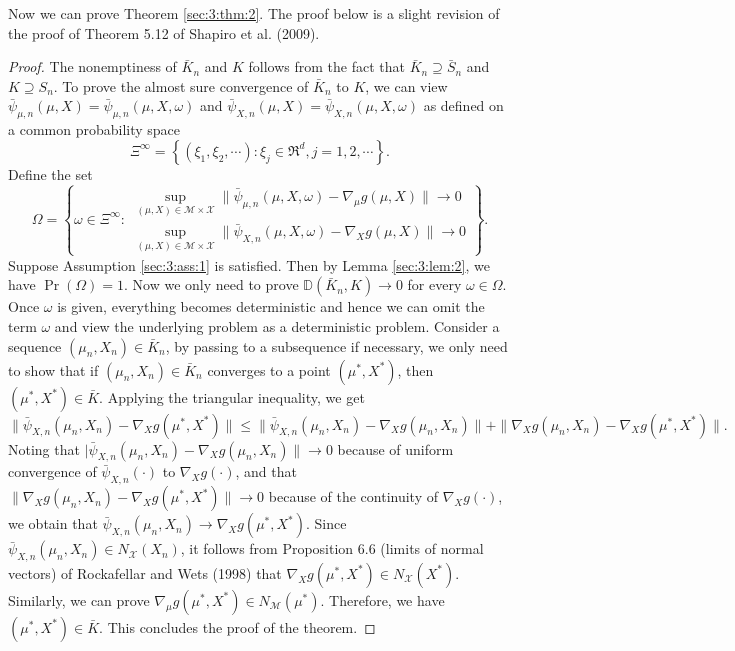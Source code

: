 Now we can prove Theorem \ref{sec:3:thm:2}. The proof below is a
slight revision of the proof of Theorem 5.12 of Shapiro et al.
(2009).

\begin{proof}
The nonemptiness of $\bar K_n$ and $K$ follows from the fact that
$\bar K_n\supseteq \bar S_n$ and $K\supseteq S_n$. To prove the
almost sure convergence of $\bar K_n$ to $K$, we can view
$\bar\psi_{\mu,n}(\mu,X)=\bar\psi_{\mu,n}(\mu,X,\omega)$ and
$\bar\psi_{X,n}(\mu,X)=\bar\psi_{X,n}(\mu,X,\omega)$ as defined on a
common probability space
\begin{equation*}
\Xi^{\infty}=\left\{(\xi_1,\xi_2,\cdots):\xi_j\in \Re^d,
j=1,2,\cdots\right\}.
\end{equation*}
Define the set
\begin{equation*}
\Omega=\left\{\omega\in \Xi^{\infty}:\begin{array}{ll}
\sup_{(\mu,X)\in\mathcal{M}\times\mathcal {X}}\|\bar
\psi_{\mu,n}(\mu,X,\omega)-\nabla_\mu g(\mu,X)\|\to 0\\
\sup_{(\mu,X)\in\mathcal{M}\times\mathcal {X}}\|\bar
\psi_{X,n}(\mu,X,\omega)-\nabla_X g(\mu,X)\|\to 0
\end{array}
\right\}.
\end{equation*}
Suppose Assumption \ref{sec:3:ass:1} is satisfied. Then by Lemma
\ref{sec:3:lem:2}, we have $\Pr(\Omega)=1$. Now we only need to
prove $\mathbb{D}(\bar K_n,K)\to 0$ for every $\omega\in \Omega$.
Once $\omega$ is given, everything becomes deterministic and hence
we can omit the term $\omega$ and view the underlying problem as a
deterministic problem. Consider a sequence $(\mu_n,X_n)\in \bar
K_n$, by passing to a subsequence if necessary, we only need to show
that if $(\mu_n,X_n)\in \bar K_n$ converges to a point
$(\mu^*,X^*)$, then $(\mu^*,X^*)\in \bar K$. Applying the triangular
inequality, we get
\begin{equation*}
\|\bar \psi_{X,n}(\mu_n,X_n)-\nabla_X g(\mu^*,X^*)\|\le\|\bar
\psi_{X,n}(\mu_n,X_n)-\nabla_X g(\mu_n,X_n)\|+ \|\nabla_X
g(\mu_n,X_n)-\nabla_X g(\mu^*,X^*)\|.
\end{equation*}
Noting that $|\bar \psi_{X,n}(\mu_n,X_n)-\nabla_X g(\mu_n,X_n)\|\to
0$ because of uniform convergence of $\bar \psi_{X,n}(\cdot)$ to
$\nabla_X g(\cdot)$, and that $\|\nabla_X g(\mu_n,X_n)-\nabla_X
g(\mu^*,X^*)\|\to 0$ because of the continuity of $\nabla_X
g(\cdot)$, we obtain that $\bar \psi_{X,n}(\mu_n,X_n)\to \nabla_X
g(\mu^*,X^*)$. Since $\bar \psi_{X,n}(\mu_n,X_n)\in
N_{\mathcal{X}}(X_n)$, it follows from Proposition 6.6 (limits of
normal vectors) of Rockafellar and Wets (1998) that $\nabla_X
g(\mu^*,X^*)\in N_{\mathcal{X}}(X^*)$. Similarly, we can prove
$\nabla_\mu g(\mu^*,X^*)\in N_{\mathcal{M}}(\mu^*)$. Therefore, we
have $(\mu^*,X^*)\in \bar K$. This concludes the proof of the
theorem.
\end{proof}
